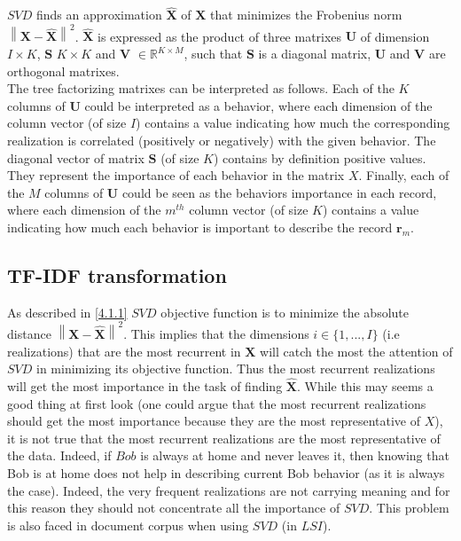 $SVD$ finds an approximation $\boldsymbol{\widehat{X}}$ of $\boldsymbol{X}$ that minimizes the Frobenius norm $\left \|  \boldsymbol{X}-\boldsymbol{\widehat{X}}\right \|^{2}$. $\boldsymbol{\widehat{X}}$ is expressed as the product of three matrixes $\boldsymbol{U}$ of dimension $I\times K$, $\boldsymbol{S}$ $K \times K$ and $\boldsymbol{V}$ $\in\mathbb{R}^{K\times M}$, such that $\boldsymbol{S}$ is a diagonal matrix, $\boldsymbol{U}$ and $\boldsymbol{V}$ are orthogonal matrixes.
\\The tree factorizing matrixes can be interpreted as follows. Each of the $K$ columns of $\boldsymbol{U}$ could be interpreted as a behavior, where each dimension of the column vector (of size $I$) contains a value indicating how much the corresponding realization is correlated (positively or negatively) with the given behavior. The diagonal vector of matrix $\boldsymbol{S}$ (of size $K$) contains by definition positive values. They represent the importance of each behavior in the matrix $X$. Finally, each of the $M$ columns of  $\boldsymbol{U}$ could be seen as the behaviors importance in each record, where each dimension of the $m^{th}$ column vector (of size $K$) contains a value indicating how much each behavior is important to describe the record $\mathbf{r}_{m}$.

\subsection{TF-IDF transformation}
As described in \ref{4.1.1} $SVD$ objective function is to minimize the absolute distance $\left \|  \boldsymbol{X}-\boldsymbol{\widehat{X}}\right \|^{2}$. This implies that the dimensions $i\in\{1,...,I\}$ (i.e realizations) that are the most recurrent in $\boldsymbol{X}$ will catch the most the attention of $SVD$ in minimizing its objective function. Thus the most recurrent realizations will get the most importance in the task of finding $\boldsymbol{\widehat{X}}$. While this may seems a good thing at first look (one could argue that the most recurrent realizations should get the most importance because they are the most representative of $X$), it is not true that the most recurrent realizations are the most representative of the data. Indeed, if $Bob$ is always at home and never leaves it, then knowing that Bob is at home does not help in describing current Bob behavior (as it is always the case). Indeed, the very frequent realizations are not carrying meaning and for this reason they should not concentrate all the importance of $SVD$. This problem is also faced in document corpus when using $SVD$ (in $LSI$). \par

